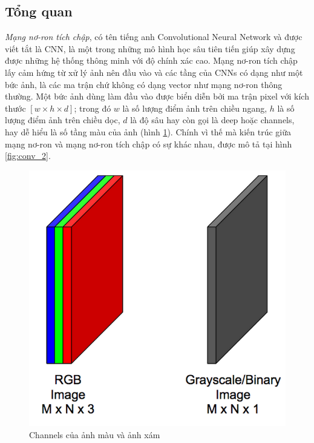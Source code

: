 \subsection{Tổng quan}
  \textit{Mạng nơ-ron tích chập}, có tên tiếng anh  Convolutional Neural Network và được viết tắt là CNN, là một trong những mô hình học sâu tiên tiến giúp xây dựng được những hệ thống thông minh với độ chính xác cao. Mạng nơ-ron tích chập lấy cảm hứng từ xử lý ảnh nên đầu vào và các tầng của CNNs có dạng như một bức ảnh, là các ma trận chứ không có dạng vector như mạng nơ-ron thông thường. Một bức ảnh dùng làm đầu vào được biển diễn bởi ma trận pixel với kích thước $[w\times h \times d]$; trong đó $w$ là số lượng điểm ảnh trên chiều ngang, $h$ là số lượng điểm ảnh trên chiều dọc, $d$ là độ sâu hay còn gọi là deep hoặc channels, hay dễ hiểu là số tầng màu của ảnh (hình \ref{fig:rgb}). Chính vì thế mà kiến trúc giữa mạng nơ-ron và mạng nơ-ron tích chập có sự khác nhau, được mô tả tại hình \ref{fig:conv_2}.
\begin{figure}[H]
\begin{center}
\includegraphics[scale=0.2]{chap3/image/cnn/dimentionimg.png}
\end{center}
\caption{Channels của ảnh màu và ảnh xám}
\label{fig:rgb}
\end{figure}

